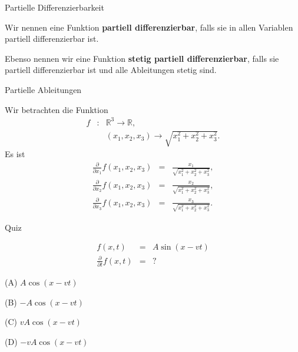 \documentclass[german]{beamer}
\newcommand{\bq}{\begin{eqnarray*}}
\newcommand{\eq}{\end{eqnarray*}}
\begin{document}
\begin{frame}{Partielle Differenzierbarkeit}

\begin{definition}
Wir nennen eine Funktion {\bf partiell differenzierbar}, falls sie in allen Variablen partiell differenzierbar ist.
\end{definition}

\begin{definition}
Ebenso nennen wir eine Funktion {\bf stetig partiell differenzierbar}, falls sie partiell differenzierbar ist und alle
Ableitungen stetig sind.
\end{definition}

\end{frame}

\begin{frame}{Partielle Ableitungen}

\begin{example}
Wir betrachten die Funktion
\bq
 f & : & {\mathbb R}^3 \rightarrow {\mathbb R},
 \nonumber \\
 & & (x_1,x_2,x_3) \rightarrow \sqrt{x_1^2+x_2^2+x_3^2}.
\eq
Es ist
\bq
 \frac{\partial}{\partial x_1} f(x_1,x_2,x_3) & = & \frac{x_1}{\sqrt{x_1^2+x_2^2+x_3^2}},
 \nonumber \\
 \frac{\partial}{\partial x_2} f(x_1,x_2,x_3) & = & \frac{x_2}{\sqrt{x_1^2+x_2^2+x_3^2}},
 \nonumber \\
 \frac{\partial}{\partial x_3} f(x_1,x_2,x_3) & = & \frac{x_3}{\sqrt{x_1^2+x_2^2+x_3^2}}.
\eq
\end{example}

\end{frame}

\begin{frame}{Quiz}

\bq
 f\left(x,t\right) & = & 
 A \sin\left(x-vt\right)
 \nonumber \\
 \frac{\partial}{\partial t} f\left(x,t\right)
 & = & ?
\eq
\begin{description}
\item{(A)} \;\;\;\;\;\;$A \cos(x-vt)$
\item{(B)} \;\;\;$-A \cos(x-vt)$
\item{(C)} \;\;\;\;\;\;$v A \cos(x-vt)$
\item{(D)} \;\;\;$- v A \cos(x-vt)$
\end{description}

\end{frame}
\end{document}
